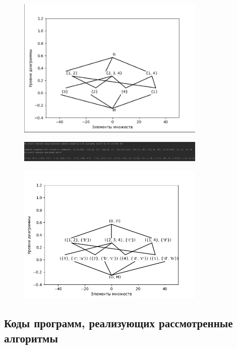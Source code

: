 \documentclass[bachelor, och, labwork]{shiza}
\begin{document}
        \begin{figure}[H]
            \centering
            \includegraphics[width=0.8\textwidth]{pic/9.png}
            \caption{}
        \end{figure}

        \begin{figure}[H]
            \centering
            \includegraphics[width=0.8\textwidth]{pic/10.png}
            \caption{}
        \end{figure}

        \begin{figure}[H]
            \centering
            \includegraphics[width=0.8\textwidth]{pic/11.png}
            \caption{}
        \end{figure}

    \subsection{Коды программ, реализующих рассмотренные алгоритмы}
\end{document}

